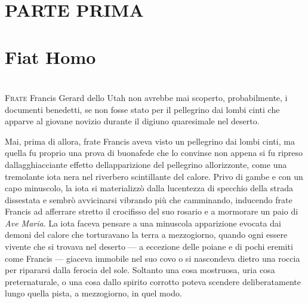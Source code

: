 \mainmatter
\pagestyle{headings} 	%
						

{ \chapter*{PARTE PRIMA\\\leavevmode\\\footnotesize{Fiat Homo}}}

\chapter{\phantom{text}}

\lettrine{F}{rate} Francis Gerard dello Utah non avrebbe mai scoperto, probabilmente,
i documenti benedetti, se non fosse stato per il pellegrino dai lombi
cinti che apparve al giovane novizio durante il digiuno quaresimale nel
deserto.

Mai, prima di allora, frate Francis aveva visto un pellegrino dai lombi
cinti, ma quella fu proprio una prova di buonafede che lo convinse non
appena si fu ripreso dall\textquotesingle agghiacciante effetto
dell\textquotesingle apparizione del pellegrino
all\textquotesingle orizzonte, come una tremolante iota nera nel
riverbero scintillante del calore. Privo di gambe e con un capo
minuscolo, la iota si materializzò dalla lucentezza di specchio della
strada dissestata e sembrò avvicinarsi vibrando più che camminando,
inducendo frate Francis ad afferrare stretto il crocifisso del suo
rosario e a mormorare un paio di \emph{Ave Maria}. La iota faceva
pensare a una minuscola apparizione evocata dai demoni del calore che
torturavano la terra a mezzogiorno, quando ogni essere vivente che si
trovava nel deserto --- a eccezione delle poiane e di pochi eremiti come
Francis --- giaceva immobile nel suo covo o si nascondeva dietro una
roccia per ripararsi dalla ferocia del sole. Soltanto una cosa
mostruosa, uria cosa preternaturale, o una cosa dallo spirito corrotto
poteva scendere deliberatamente lungo quella pista, a mezzogiorno, in
quel modo.

